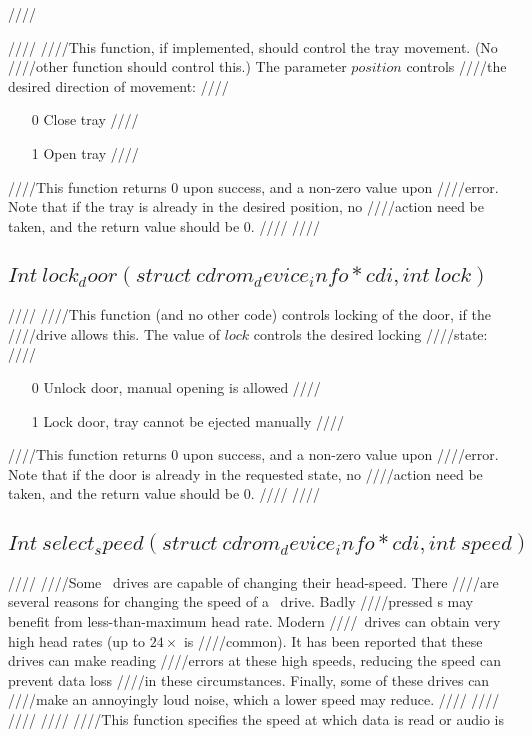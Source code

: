 ////\documentclass{article}
\begin{document}
////
////This function, if implemented, should control the tray movement. (No
////other function should control this.) The parameter $position$ controls
////the desired direction of movement:
////\begin{itemize}
////\item[0] Close tray
////\item[1] Open tray
////\end{itemize}
////This function returns 0 upon success, and a non-zero value upon
////error. Note that if the tray is already in the desired position, no
////action need be taken, and the return value should be 0. 
////
////\subsection{$Int\ lock_door(struct\ cdrom_device_info * cdi, int\ lock)$}
////
////This function (and no other code) controls locking of the door, if the
////drive allows this. The value of $lock$ controls the desired locking
////state:
////\begin{itemize}
////\item[0] Unlock door, manual opening is allowed
////\item[1] Lock door, tray cannot be ejected manually
////\end{itemize}
////This function returns 0 upon success, and a non-zero value upon
////error. Note that if the door is already in the requested state, no
////action need be taken, and the return value should be 0. 
////
////\subsection{$Int\ select_speed(struct\ cdrom_device_info * cdi, int\ speed)$}
////
////Some \cdrom\ drives are capable of changing their head-speed. There
////are several reasons for changing the speed of a \cdrom\ drive. Badly
////pressed \cdrom s may benefit from less-than-maximum head rate. Modern
////\cdrom\ drives can obtain very high head rates (up to $24\times$ is
////common).  It has been reported that these drives can make reading
////errors at these high speeds, reducing the speed can prevent data loss
////in these circumstances.  Finally, some of these drives can
////make an annoyingly loud noise, which a lower speed may reduce. %
////%
////%
////%
////
////This function specifies the speed at which data is read or audio is
\end{document}
